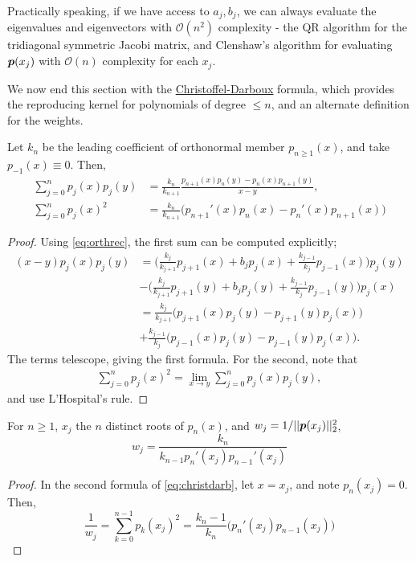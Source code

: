 Practically speaking, if we have access to $a_j,b_j$, we can always evaluate the eigenvalues and eigenvectors with $\mathcal{O}(n^2)$ complexity - the QR algorithm for the tridiagonal symmetric Jacobi matrix, and Clenshaw's algorithm \cite{Clenshaw} for evaluating $\boldsymbol{p}(x_j)$ with $\mathcal{O}(n)$ complexity for each $x_j$. 

We now end this section with the \underline{Christoffel-Darboux} formula, which provides the reproducing kernel for polynomials of degree $\leq n$, and an alternate definition for the weights.
\begin{proposition}\normalfont
Let $k_n$ be the leading coefficient of orthonormal member $p_{n\geq 1}(x)$, and take $p_{-1}(x)\equiv0$. Then,
\begin{equation}\label{eq:christdarb}
\begin{split}
\sum_{j=0}^np_j(x)p_j(y) &= \frac{k_n}{k_{n+1}}\frac{p_{n+1}(x)p_n(y)-p_n(x)p_{n+1}(y)}{x-y},\\
\sum_{j=0}^np_j(x)^2 &=\frac{k_n}{k_{n+1}}\Big(p_{n+1}'(x)p_n(x) - p_n'(x)p_{n+1}(x)\Big)
\end{split}
\end{equation}
\end{proposition}
\begin{proof}
Using \eqref{eq:orthrec}, the first sum can be computed explicitly;
\begin{align*}
(x-y)p_j(x)p_j(y) &= \Big(\frac{k_j}{k_{j+1}}p_{j+1}(x)+b_jp_j(x)+\frac{k_{j-1}}{k_j}p_{j-1}(x)\Big)p_j(y)\\&-\Big(\frac{k_j}{k_{j+1}}p_{j+1}(y)+b_jp_j(y)+\frac{k_{j-1}}{k_j}p_{j-1}(y)\Big)p_j(x)\\
&= \frac{k_j}{k_{j+1}}\big(p_{j+1}(x)p_j(y)-p_{j+1}(y)p_j(x)\big)\\
&+ \frac{k_{j-1}}{k_j}\big(p_{j-1}(x)p_j(y)-p_{j-1}(y)p_j(x)\big).
\end{align*}
The terms telescope, giving the first formula. For the second, note that
\begin{align*}
\sum_{j=0}^n p_j(x)^2 = \lim_{x\to y}\sum_{j=0}^n p_j(x)p_j(y),
\end{align*}
and use L'Hospital's rule.
\end{proof}
\begin{theorem}\normalfont
For $n\geq 1$, $x_j$ the $n$ distinct roots of $p_n(x)$, and $w_j = 1/||\boldsymbol{p}(x_j)||_2^2$,
\begin{equation}
w_j = \frac{k_n}{k_{n-1}p_n'(x_j)p_{n-1}'(x_j)}
\end{equation}
\end{theorem}
\begin{proof}
In the second formula of \eqref{eq:christdarb}, let $x=x_j$, and note $p_n(x_j)=0$. Then, $$\frac{1}{w_j} = \sum_{k=0}^{n-1}p_k(x_j)^2 = \frac{k_n-1}{k_n}\big(p_n'(x_j)p_{n-1}(x_j)\big)$$
\end{proof}


%




